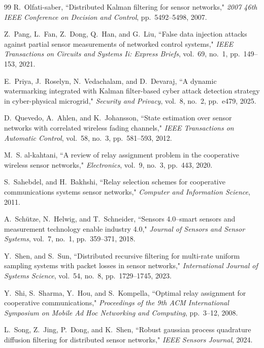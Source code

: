 \documentclass[twocolumn]{IEEEtran}
\begin{document}
\begin{thebibliography}{99}
R.~Olfati-saber, ``Distributed Kalman filtering for sensor networks," \textit{2007 46th IEEE Conference on Decision and Control}, pp.~5492--5498, 2007.

Z.~Pang, L.~Fan, Z.~Dong, Q.~Han, and G.~Liu, ``False data injection attacks against partial sensor measurements of networked control systems," \textit{IEEE Transactions on Circuits and Systems Ii: Express Briefs}, vol.~69, no.~1, pp.~149--153, 2021.

E.~Priya, J.~Roselyn, N.~Vedachalam, and D.~Devaraj, ``A dynamic watermarking integrated with Kalman filter-based cyber attack detection strategy in cyber-physical microgrid," \textit{Security and Privacy}, vol.~8, no.~2, pp.~e479, 2025.

D.~Quevedo, A.~Ahlen, and K.~Johansson, ``State estimation over sensor networks with correlated wireless fading channels," \textit{IEEE Transactions on Automatic Control}, vol.~58, no.~3, pp.~581--593, 2012.

M.~S. al-kahtani, ``A review of relay assignment problem in the cooperative wireless sensor networks," \textit{Electronics}, vol.~9, no.~3, pp.~443, 2020.

S.~Sahebdel, and H.~Bakhshi, ``Relay selection schemes for cooperative communications systems sensor networks," \textit{Computer and Information Science}, 2011.

A.~Sch{\"u}tze, N.~Helwig, and T.~Schneider, ``Sensors 4.0--smart sensors and measurement technology enable industry 4.0," \textit{Journal of Sensors and Sensor Systems}, vol.~7, no.~1, pp.~359--371, 2018.

Y.~Shen, and S.~Sun, ``Distributed recursive filtering for multi-rate uniform sampling systems with packet losses in sensor networks," \textit{International Journal of Systems Science}, vol.~54, no.~8, pp.~1729--1745, 2023.

Y.~Shi, S.~Sharma, Y.~Hou, and S.~Kompella, ``Optimal relay assignment for cooperative communications," \textit{Proceedings of the 9th ACM International Symposium on Mobile Ad Hoc Networking and Computing}, pp.~3--12, 2008.

L.~Song, Z.~Jing, P.~Dong, and K.~Shen, ``Robust gaussian process quadrature diffusion filtering for distributed sensor networks," \textit{IEEE Sensors Journal}, 2024.


\end{thebibliography}
\end{document}
